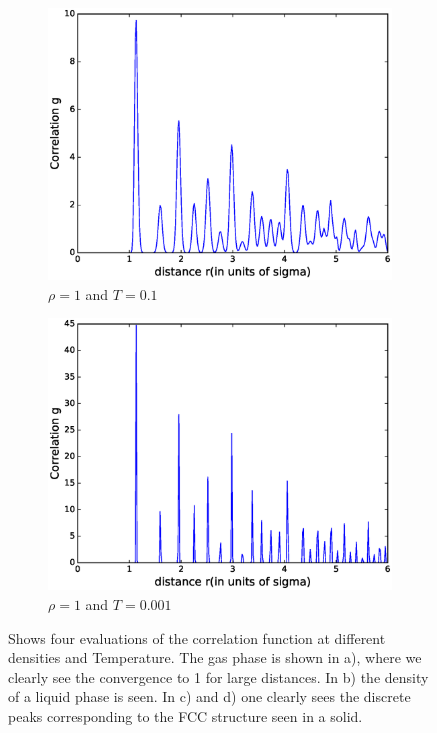\documentclass[twoside]{article}
\begin{document}
\begin{figure}
	\begin{subfigure}[b]{0.48\textwidth}
		\centering
		\includegraphics[width=0.9\linewidth]{fig/figure_corr_solid.eps}
		\caption{$\rho = 1$ and $T = 0.1$}
		\label{fig:figure_corr_solid}
	\end{subfigure}
	\begin{subfigure}[b]{0.48\textwidth}
		\centering
		\includegraphics[width=0.9\linewidth]{fig/figure_corr_solid2.eps}
		\caption{$\rho = 1$ and $T = 0.001$}
		\label{fig:figure_corr_solid2}
	\end{subfigure}
	\caption{Shows four evaluations of the correlation function at different densities and Temperature. The gas phase is shown in a), where we clearly see the convergence to 1 for large distances. In b) the density of a liquid phase is seen. In c) and d) one clearly sees the discrete peaks corresponding to the FCC structure seen in a solid.}
	\label{fig:figure_corr}
\end{figure}
\end{document}
